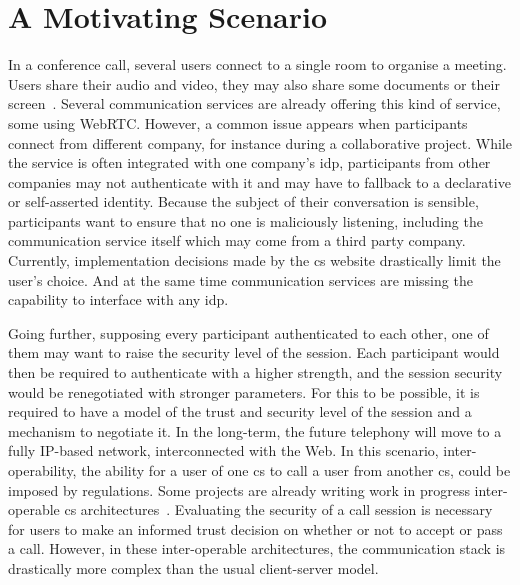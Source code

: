\section*{A Motivating Scenario}
\label{introduction.scenario}
In a conference call, several users connect to a single room to organise a meeting.
Users share their audio and video, they may also share some documents or their screen~\cite{w3c:screencapture}.
Several communication services are already offering this kind of service, some using WebRTC. 
However, a common issue appears when participants connect from different company, for instance during a collaborative project.
While the service is often integrated with one company's \gls{idp}, participants from other companies may not authenticate with it and may have to fallback to a declarative or self-asserted identity.
Because the subject of their conversation is sensible, participants want to ensure that no one is maliciously listening, including the communication service itself which may come from a third party company.
Currently, implementation decisions made by the \gls{cs} website drastically limit the user's choice.
And at the same time communication services are missing the capability to interface with any \gls{idp}.

Going further, supposing every participant authenticated to each other, one of them may want to raise the security level of the session.
Each participant would then be required to authenticate with a higher strength, and the session security would be renegotiated with stronger parameters.
For this to be possible, it is required to have a model of the trust and security level of the session and a mechanism to negotiate it.
In the long-term, the future telephony will move to a fully IP-based network, interconnected with the Web.
In this scenario, inter-operability, \ie the ability for a user of one \gls{cs} to call a user from another \gls{cs}, could be imposed by regulations.
Some projects are already writing work in progress inter-operable \gls{cs} architectures~\cite{toutain2015webco,matrix,rethink}.
Evaluating the security of a call session is necessary for users to make an informed trust decision on whether or not to accept or pass a call.
However, in these inter-operable architectures, the communication stack is drastically more complex than the usual client-server model.

